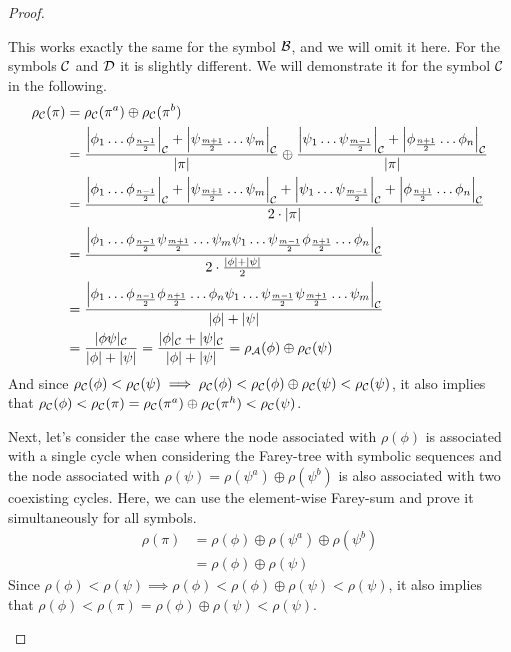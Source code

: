 \begin{proof}
\begin{itemize}
			This works exactly the same for the symbol $\mathcal{B}$, and we will omit it here.
			For the symbols $\mathcal{C}$ and $\mathcal{D}$ it is slightly different.
			We will demonstrate it for the symbol $\mathcal{C}$ in the following.
			\begin{align*}
				\rho_{\mathcal{C}}(\pi) & = \rho_{\mathcal{C}}(\pi^a) \oplus \rho_{\mathcal{C}}(\pi^b)                                                                       \\
				             & =
				\dfrac{\left|\phi_1 \dots \phi_{\frac{n-1}{2}}\right|_{\mathcal{C}} + \left|\psi_{\frac{m+1}{2}} \dots \psi_m\right|_{\mathcal{C}}}{|\pi|}
				\oplus \dfrac{\left|\psi_1 \dots \psi_{\frac{m-1}{2}}\right|_{\mathcal{C}} + \left|\phi_{\frac{n+1}{2}} \dots \phi_n\right|_{\mathcal{C}}}{|\pi|} \\
				             & =
				\dfrac
				{\left|\phi_1 \dots \phi_{\frac{n-1}{2}}\right|_{\mathcal{C}} + \left|\psi_{\frac{m+1}{2}} \dots \psi_m\right|_{\mathcal{C}} + \left|\psi_1 \dots \psi_{\frac{m-1}{2}}\right|_{\mathcal{C}} + \left|\phi_{\frac{n+1}{2}} \dots \phi_n\right|_{\mathcal{C}}}
				{2 \cdot |\pi|}                                                                                                             \\
				             & =
				\dfrac
				{\left|\phi_1 \dots \phi_{\frac{n-1}{2}} \psi_{\frac{m+1}{2}} \dots \psi_m \psi_1 \dots \psi_{\frac{m-1}{2}} \phi_{\frac{n+1}{2}} \dots \phi_n\right|_{\mathcal{C}}}
				{2 \cdot \frac{|\phi| + |\psi|}{2}}                                                                                         \\
				             & =
				\dfrac
				{\left|\phi_1 \dots \phi_{\frac{n-1}{2}} \phi_{\frac{n+1}{2}} \dots \phi_n \psi_1 \dots \psi_{\frac{m-1}{2}} \psi_{\frac{m+1}{2}} \dots \psi_m\right|_{\mathcal{C}}}
				{|\phi| + |\psi|}                                                                                                           \\
				             &
				= \dfrac{|\phi\psi|_{\mathcal{C}}}{|\phi| + |\psi|}
				= \dfrac{|\phi|_{\mathcal{C}} + |\psi|_{\mathcal{C}}}{|\phi| + |\psi|}
				= \rho_{\mathcal{A}}(\phi) \oplus \rho_{\mathcal{C}}(\psi)
			\end{align*}
			And since $\rho_{\mathcal{C}}(\phi) < \rho_{\mathcal{C}}(\psi) \implies \rho_{\mathcal{C}}(\phi) < \rho_{\mathcal{C}}(\phi) \oplus \rho_{\mathcal{C}}(\psi) < \rho_{\mathcal{C}}(\psi)$,
			it also implies that $\rho_{\mathcal{C}}(\phi) < \rho_{\mathcal{C}}(\pi) =  \rho_{\mathcal{C}}(\pi^a) \oplus \rho_{\mathcal{C}}(\pi^h) < \rho_{\mathcal{C}}(\psi)$.

			Next, let's consider the case where the node associated with $\rho(\phi)$ is associated with a single cycle when considering the Farey-tree with symbolic sequences and the node associated with $\rho(\psi) = \rho(\psi^a) \oplus \rho(\psi^b)$ is also associated with two coexisting cycles.
			Here, we can use the element-wise Farey-sum and prove it simultaneously for all symbols.
			\begin{align*}
				\rho(\pi) & = \rho(\phi) \oplus \rho(\psi^a) \oplus \rho(\psi^b) \\
				          & = \rho(\phi) \oplus \rho(\psi)
			\end{align*}
			Since $\rho(\phi) < \rho(\psi) \implies \rho(\phi) < \rho(\phi) \oplus \rho(\psi) < \rho(\psi)$, it also implies that $\rho(\phi) < \rho(\pi) = \rho(\phi) \oplus \rho(\psi) < \rho(\psi)$.


\end{itemize}
\end{proof}

